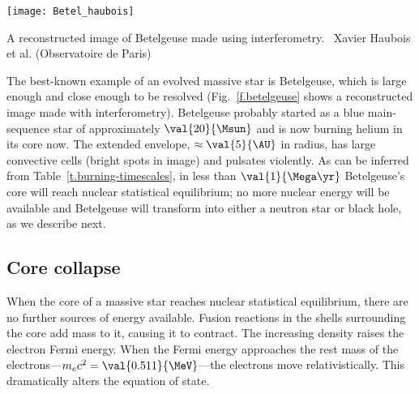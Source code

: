 \begin{marginfigure}
\texttt{[image: Betel\_haubois]}
\caption[Betelgeuse]{\label{f.betelgeuse} A reconstructed image of Betelgeuse made using interferometry. \imgcred\ Xavier Haubois et al. (Observatoire de Paris)}
\end{marginfigure}
The best-known example of an evolved massive star is Betelgeuse, which is large enough and close enough to be resolved (Fig.~\ref{f.betelgeuse} shows a reconstructed image made with interferometry). Betelgeuse probably started as a blue main-sequence star of approximately $\val{20}{\Msun}$ and is now burning helium in its core now. The extended envelope, $\approx\val{5}{\AU}$ in radius, has large convective cells (bright spots in image) and pulsates violently. As can be inferred from Table~\ref{t.burning-timescales}, in less than $\val{1}{\Mega\yr}$ Betelgeuse's core will reach nuclear statistical equilibrium; no more nuclear energy will be available and Betelgeuse will transform into either a neutron star or black hole, as we describe next.

\subsection{Core collapse}
When the core of a massive star reaches nuclear statistical equilibrium, there are no further sources of energy available. Fusion reactions in the shells surrounding the core add mass to it, causing it to contract. The increasing density raises the electron Fermi energy. When the Fermi energy approaches the rest mass of the electrons---$m_{e}c^{2} = \val{0.511}{\MeV}$---the electrons move relativistically. This dramatically alters the equation of state.

